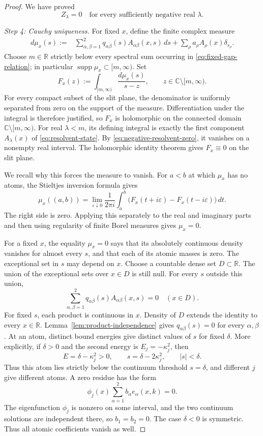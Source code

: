 \documentclass[11pt]{amsart}
\numberwithin{equation}{section}
\theoremstyle{remark}
\newcommand{\R}{\mathbb R}
\newcommand{\C}{\mathbb C}
\newcommand{\supp}{\operatorname{supp}}
\begin{document}
\begin{proof}
We have proved
\begin{equation}
 Z_\lambda=0
 \quad\text{for every sufficiently negative real $\lambda$}.
 \label{eq:negative-resolvent-zero}
\end{equation}

\smallskip
\noindent
\emph{Step 4: Cauchy uniqueness.}
For fixed $x$, define the finite complex measure
\begin{align}
 d\mu_x(s)
 :={}&\sum_{\alpha,\beta=1}^2
 q_{\alpha\beta}(s)A_{\alpha\beta}(x,s)\,ds
 +\sum_\rho a_\rho A_\rho(x)\delta_{s_\rho}.
 \label{eq:cauchy-measure}
\end{align}
Choose $m\in\R$ strictly below every spectral sum occurring in
\eqref{eq:fixed-gap-relation}; in particular
$\supp\mu_x\subset[m,\infty)$.  Set
\[
 F_x(z):=\int_{[m,\infty)}\frac{d\mu_x(s)}{s-z},
 \qquad z\in\C\setminus[m,\infty).
\]
For every compact subset of the slit plane, the denominator is uniformly
separated from zero on the support of the measure.  Differentiation under the
integral is therefore justified, so $F_x$ is holomorphic on the connected
domain $\C\setminus[m,\infty)$.  For real $\lambda<m$, its defining integral
is exactly the first component $A_\lambda(x)$ of
\eqref{eq:resolvent-state}.  By \eqref{eq:negative-resolvent-zero}, it
vanishes on a nonempty real interval.  The holomorphic identity theorem gives
$F_x\equiv0$ on the slit plane.

We recall why this forces the measure to vanish.  For $a<b$ at which
$\mu_x$ has no atoms, the Stieltjes inversion formula gives
\[
 \mu_x((a,b))
 =\lim_{\varepsilon\downarrow0}\frac1{2\pi i}
 \int_a^b\bigl(F_x(t+i\varepsilon)-F_x(t-i\varepsilon)\bigr)\,dt.
\]
The right side is zero.  Applying this separately to the real and imaginary
parts and then using regularity of finite Borel measures gives $\mu_x=0$.

For a fixed $x$, the equality $\mu_x=0$ says that its absolutely continuous
density vanishes for almost every $s$, and that each of its atomic masses is
zero.  The exceptional set in $s$ may depend on $x$.  Choose a countable dense
set $D\subset\R$.  The union of the exceptional sets over $x\in D$ is still
null.  For every $s$ outside this union,
\[
 \sum_{\alpha,\beta=1}^2
 q_{\alpha\beta}(s)A_{\alpha\beta}(x,s)=0
 \quad (x\in D).
\]
For fixed $s$, each product is continuous in $x$.  Density of $D$ extends the
identity to every $x\in\R$.
Lemma~\ref{lem:product-independence} gives
$q_{\alpha\beta}(s)=0$ for every $\alpha,\beta$.  At an atom, distinct bound
energies give distinct values of $s$ for fixed $\delta$.  More explicitly, if
$\delta>0$ and the second energy is $E_j=-\kappa_j^2$, then
\[
 E=\delta-\kappa_j^2>0,
 \qquad
 s=\delta-2\kappa_j^2,
 \qquad |s|<\delta.
\]
Thus this atom lies strictly below the continuum threshold $s=\delta$, and
different $j$ give different atoms.  A zero residue has the form
\[
 \phi_j(x)\sum_{\alpha=1}^2b_\alpha e_\alpha(x,k)=0.
\]
The eigenfunction $\phi_j$ is nonzero on some interval, and the two continuum
solutions are independent there, so $b_1=b_2=0$.  The case $\delta<0$ is
symmetric.  Thus all atomic coefficients vanish as well.
\end{proof}
\end{document}
